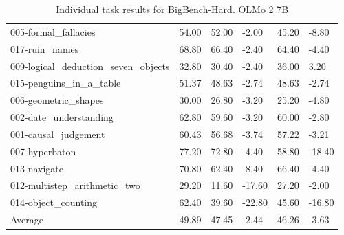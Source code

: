 \documentclass{article} %
\begin{document}
\begin{table}[]
\begin{tabular}{llllll}
005-formal\_fallacies                           & 54.00    & 52.00    & -2.00     & 45.20   & -8.80    \\
017-ruin\_names                                 & 68.80    & 66.40    & -2.40     & 64.40   & -4.40    \\
009-logical\_deduction\_seven\_objects          & 32.80    & 30.40    & -2.40     & 36.00   & 3.20     \\
015-penguins\_in\_a\_table                      & 51.37    & 48.63    & -2.74     & 48.63   & -2.74    \\
006-geometric\_shapes                           & 30.00    & 26.80    & -3.20     & 25.20   & -4.80    \\
002-date\_understanding                         & 62.80    & 59.60    & -3.20     & 60.00   & -2.80    \\
001-causal\_judgement                           & 60.43    & 56.68    & -3.74     & 57.22   & -3.21    \\
007-hyperbaton                                  & 77.20    & 72.80    & -4.40     & 58.80   & -18.40   \\
013-navigate                                    & 70.80    & 62.40    & -8.40     & 66.40   & -4.40    \\
012-multistep\_arithmetic\_two                  & 29.20    & 11.60    & -17.60    & 27.20   & -2.00    \\
014-object\_counting                            & 62.40    & 39.60    & -22.80    & 45.60   & -16.80   \\ \hline
Average                                         & 49.89    & 47.45    & -2.44     & 46.26   & -3.63   
\end{tabular}
\caption{Individual task results for BigBench-Hard. OLMo 2 7B}
\label{tab:bbh_cot}
\end{table}
\end{document}
